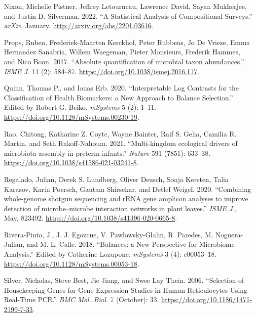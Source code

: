 \documentclass[
]{article}
\newlength{\cslhangindent}
\newlength{\cslentryspacingunit} %
\newenvironment{CSLReferences}[2] %
 {%
  \setlength{\parindent}{0pt}
  \ifodd #1
  \let\oldpar\par
  \def\par{\hangindent=\cslhangindent\oldpar}
  \fi
  \setlength{\parskip}{#2\cslentryspacingunit}
 }%
 {}
\begin{document}
\begin{CSLReferences}{1}{0}
\leavevmode{}%
Nixon, Michelle Pistner, Jeffrey Letourneau, Lawrence David, Sayan Mukherjee, and Justin D. Silverman. 2022. {``{A Statistical Analysis of Compositional Surveys}.''} \emph{arXiv}, January. \url{http://arxiv.org/abs/2201.03616}.

\leavevmode{}%
Props, Ruben, Frederiek-Maarten Kerckhof, Peter Rubbens, Jo De Vrieze, Emma Hernandez Sanabria, Willem Waegeman, Pieter Monsieurs, Frederik Hammes, and Nico Boon. 2017. {``{Absolute quantification of microbial taxon abundances}.''} \emph{ISME J.} 11 (2): 584--87. \url{https://doi.org/10.1038/ismej.2016.117}.

\leavevmode{}%
Quinn, Thomas P., and Ionas Erb. 2020. {``{Interpretable Log Contrasts for the Classification of Health Biomarkers: a New Approach to Balance Selection}.''} Edited by Robert G. Beiko. \emph{mSystems} 5 (2): 1--11. \url{https://doi.org/10.1128/mSystems.00230-19}.

\leavevmode{}%
Rao, Chitong, Katharine Z. Coyte, Wayne Bainter, Raif S. Geha, Camilia R. Martin, and Seth Rakoff-Nahoum. 2021. {``{Multi-kingdom ecological drivers of microbiota assembly in preterm infants}.''} \emph{Nature} 591 (7851): 633--38. \url{https://doi.org/10.1038/s41586-021-03241-8}.

\leavevmode{}%
Regalado, Julian, Derek S. Lundberg, Oliver Deusch, Sonja Kersten, Talia Karasov, Karin Poersch, Gautam Shirsekar, and Detlef Weigel. 2020. {``{Combining whole-genome shotgun sequencing and rRNA gene amplicon analyses to improve detection of microbe--microbe interaction networks in plant leaves}.''} \emph{ISME J.}, May, 823492. \url{https://doi.org/10.1038/s41396-020-0665-8}.

\leavevmode{}%
Rivera-Pinto, J., J. J. Egozcue, V. Pawlowsky-Glahn, R. Paredes, M. Noguera-Julian, and M. L. Calle. 2018. {``{Balances: a New Perspective for Microbiome Analysis}.''} Edited by Catherine Lozupone. \emph{mSystems} 3 (4): e00053--18. \url{https://doi.org/10.1128/mSystems.00053-18}.

\leavevmode{}%
Silver, Nicholas, Steve Best, Jie Jiang, and Swee Lay Thein. 2006. {``Selection of Housekeeping Genes for Gene Expression Studies in Human Reticulocytes Using Real-Time {PCR}.''} \emph{BMC Mol. Biol.} 7 (October): 33. \url{https://doi.org/10.1186/1471-2199-7-33}.


\end{CSLReferences}
\end{document}
